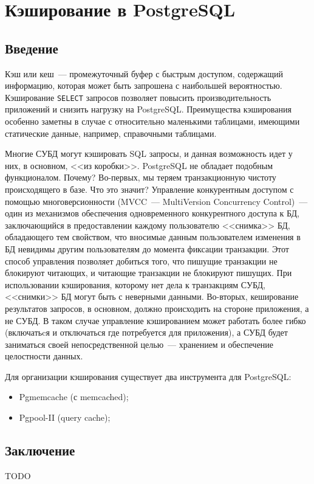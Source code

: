 \chapter{Кэширование в PostgreSQL}

\begin{epigraphs}
\end{epigraphs}

\section{Введение}

Кэш или кеш~--- промежуточный буфер с быстрым доступом, содержащий информацию, которая может быть запрошена с наибольшей вероятностью. Кэширование \lstinline!SELECT! запросов позволяет повысить производительность приложений и снизить нагрузку на PostgreSQL. Преимущества кэширования особенно заметны в случае с относительно маленькими таблицами, имеющими статические данные, например, справочными таблицами.

Многие СУБД могут кэшировать SQL запросы, и данная возможность идет у них, в основном, <<из коробки>>. PostgreSQL не обладает подобным функционалом. Почему? Во-первых, мы теряем транзакционную чистоту происходящего в базе. Что это значит? Управление конкурентным доступом с помощью многоверсионности (MVCC~--- MultiVersion Concurrency Control)~--- один из механизмов обеспечения одновременного конкурентного доступа к БД, заключающийся в предоставлении каждому пользователю <<снимка>> БД, обладающего тем свойством, что вносимые данным пользователем изменения в БД невидимы другим пользователям до момента фиксации транзакции. Этот способ управления позволяет добиться того, что пишущие транзакции не блокируют читающих, и читающие транзакции не блокируют пишущих. При использовании кэширования, которому нет дела к транзакциям СУБД, <<снимки>> БД могут быть с неверными данными. Во-вторых, кеширование результатов запросов, в основном, должно происходить на стороне приложения, а не СУБД. В таком случае управление кэшированием может работать более гибко (включатьcя и отключаться где потребуется для приложения), а СУБД будет заниматься своей непосредственной целью~--- хранением и обеспечение целостности данных.

Для организации кэширования существует два инструмента для PostgreSQL:

\begin{itemize}
  \item Pgmemcache (с memcached);
  \item Pgpool-II (query cache);
\end{itemize}





\section{Заключение}

TODO
